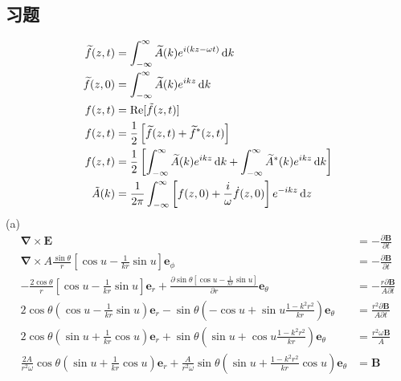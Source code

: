 \subsection{习题}
\begin{align*}
    \widetilde{f}(z,t)&=\int_{-\infty}^{\infty}\widetilde{A}(k)e^{i(kz-\omega t)}\dif k\\
    \widetilde{f}(z,0)&=\int_{-\infty}^{\infty}\widetilde{A}(k)e^{ikz}\dif k\\
    f(z,t) &= \text{Re}[\tilde{f}(z,t)] \\
    f(z,t) &= \frac{1}{2} \left[ \widetilde{f}(z,t) + \widetilde{f}^*(z,t) \right]\\
    f(z,t) &= \frac{1}{2} \left[ \int_{-\infty}^{\infty}\widetilde{A}(k)e^{ikz}\dif k + \int_{-\infty}^{\infty}\widetilde{A}^*(k)e^{ikz}\dif k \right]\\
    \tilde{A}(k) &= \frac{1}{2\pi} \int_{-\infty}^{\infty} \left[ f(z,0) + \frac{i}{\omega} \dot{f}(z,0) \right] e^{-ikz} \dif z
\end{align*}
(a)\begin{align*}
    \boldsymbol\nabla \times \boldsymbol{E} &= -\frac{\partial \boldsymbol{B}}{\partial t}\\
    \boldsymbol\nabla \times A\frac{\sin\theta}{r}\left[\cos u-\frac{1}{kr}\sin u\right]\boldsymbol{e}_\phi &= -\frac{\partial \boldsymbol{B}}{\partial t}\\
    -\frac{2\cos\theta}{r}\left[\cos u-\frac{1}{kr}\sin u\right]\boldsymbol{e}_r
    +\frac{\partial \sin\theta\left[\cos u-\frac{1}{kr}\sin u\right]}{\partial r}
    \boldsymbol{e}_\theta&=-\frac{r\partial \boldsymbol{B}}{A\partial t}\\
    2\cos\theta\left(\cos u-\frac{1}{kr}\sin u\right)\boldsymbol{e}_r
    -\sin\theta\left(-\cos u
    +\sin u\frac{1-k^2r^2}{kr}\right)
    \boldsymbol{e}_\theta&=\frac{r^2\partial \boldsymbol{B}}{A\partial t}\\
    2\cos\theta\left(\sin u+\frac{1}{kr}\cos u\right)\boldsymbol{e}_r
    +\sin\theta\left(\sin u
    +\cos u\frac{1-k^2r^2}{kr}\right)
    \boldsymbol{e}_\theta&=\frac{r^2\omega \boldsymbol{B}}{A}\\
    \frac{2A}{r^2\omega}\cos\theta\left(\sin u+\frac{1}{kr}\cos u\right)\boldsymbol{e}_r
    +\frac{A}{r^2\omega}\sin\theta\left(\sin u
    +\frac{1-k^2r^2}{kr}\cos u\right)
    \boldsymbol{e}_\theta&=\boldsymbol{B}\\
    \end{align*}
